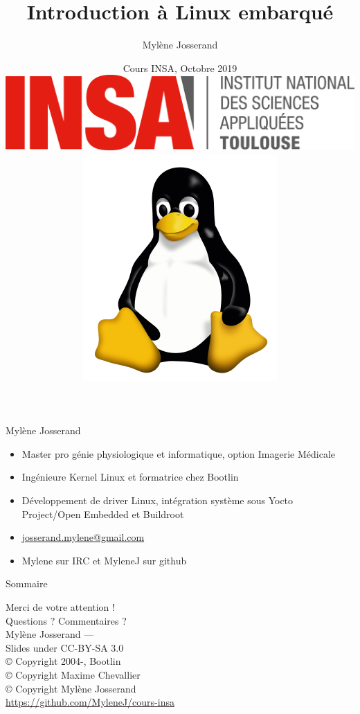 \documentclass[aspectratio=169,obeyspaces,spaces,hyphens,dvipsnames]{beamer}
\title{Introduction à Linux embarqué}
\author[Mylène Josserand]
{Mylène Josserand}
\date[Octobre 2019]
{Cours INSA, Octobre 2019 \\
  \vspace{0.5cm}
  \includegraphics[scale=0.1]{pictures/insa-tls.png}
  \hspace{0.5cm}
  \includegraphics[scale=0.1]{pictures/tux.png}
}
\institute[]
{Développeuse et formatrice Linux embarqué}
\begin{document}
\begin{frame}
  \titlepage
\end{frame}

\begin{frame}{Mylène Josserand}
  \begin{itemize}
  \item Master pro génie physiologique et informatique, option Imagerie Médicale
  \item Ingénieure Kernel Linux et formatrice chez Bootlin
  \item Développement de driver Linux, intégration système sous Yocto Project/Open Embedded et Buildroot
  \item \url{josserand.mylene@gmail.com}
  \item Mylene sur IRC et MyleneJ sur github
  \end{itemize}
\end{frame}

\begin{frame}{Sommaire}
  \tiny \tableofcontents%
\end{frame}







\begin{frame}
  \begin{center}
    \Huge
    Merci de votre attention ! \\
    Questions ? Commentaires ?\\
    \vspace{1cm}
    \large
    Mylène Josserand — \\
    \vspace{1cm}
    Slides under CC-BY-SA 3.0\\
    \scriptsize{© Copyright 2004-\the\year, Bootlin\\
    © Copyright Maxime Chevallier\\
    © Copyright Mylène Josserand\\
    \url{https://github.com/MyleneJ/cours-insa}}
  \end{center}
\end{frame}
\end{document}
